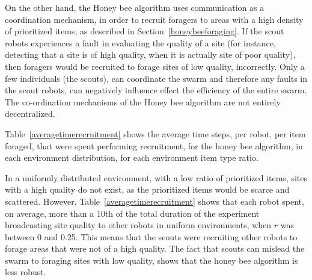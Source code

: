 On the other hand, the Honey bee algorithm uses communication as a coordination mechanism, in order to recruit foragers to areas with a high density of prioritized items, as described in Section~\ref{honeybeeforaging}. If the scout robots experiences a fault in evaluating the quality of a site (for instance, detecting that a site is of high quality, when it is actually site of poor quality), then foragers would be recruited to forage sites of low quality, incorrectly. Only a few individuals (the scouts), can coordinate the swarm and therefore any faults in the scout robots, can negatively influence effect the efficiency of the entire swarm. The co-ordination mechanisms of the Honey bee algorithm are not entirely decentralized.

Table~\ref{averagetimerecruitment} shows the average time steps, per robot, per item foraged, that were spent performing recruitment, for the honey bee algorithm, in each environment distribution, for each environment item type ratio. 

In a uniformly distributed environment, with a low ratio of prioritized items, sites with a high quality do not exist, as the prioritized items would be scarce and scattered. However, Table~\ref{averagetimerecruitment} shows that each robot spent, on average, more than a 10th of the total duration of the experiment broadcasting site quality to other robots in uniform environments, when $r$ was between 0 and 0.25. This means that the scouts were recruiting other robots to forage areas that were not of a high quality. The fact that scouts can mislead the swarm to foraging sites with low quality, shows that the honey bee algorithm is less robust.

